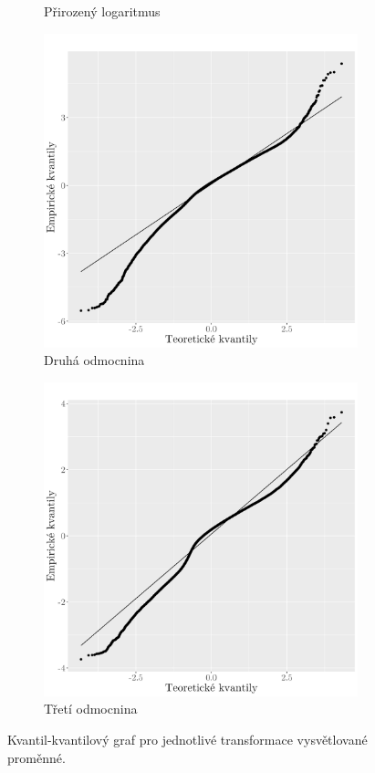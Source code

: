 \begin{figure}
\begin{subfigure}{0.45\textwidth}
		\caption{Přirozený logaritmus}
		\label{fig:qq_log}
	\end{subfigure}
	\hfill
	\begin{subfigure}{0.45\textwidth}
  \includegraphics[width=\textwidth]{img/ch2/qq_modmax15cm_sqrt.png}
		\caption{Druhá odmocnina}
		\label{fig:qq_sqrt}
	\end{subfigure}
	\hfill
	\begin{subfigure}{0.45\textwidth}
  \includegraphics[width=\textwidth]{img/ch2/qq_modmax15cm_curt.png}
		\caption{Třetí odmocnina}
		\label{fig:qq_curt}
	\end{subfigure}
	\caption{Kvantil-kvantilový graf pro jednotlivé transformace vysvětlované proměnné.}
	\label{fig:qq}
\end{figure}

